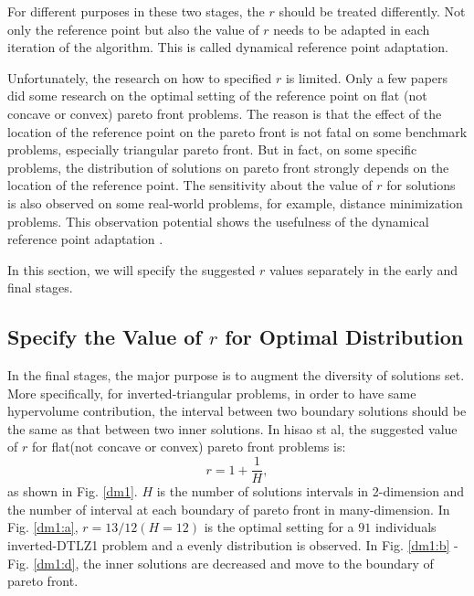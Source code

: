 \documentclass[conference]{IEEEtran}
\begin{document}
For different purposes in these two stages, the $r$ should be treated differently\cite{hisao:dynamic}. 
Not only the reference point but also the value of $r$ 
needs to be adapted in each iteration of the algorithm. 
This is called dynamical reference point adaptation. 

Unfortunately, the research on how to specified $r$ is limited.
Only a few papers\cite{hisao:RPexplanation, hisao:RPhowtoSpecify, hisao:RPspecify} 
did some research on the optimal setting of the reference point on 
flat (not concave or convex) pareto front problems. 
The reason is that the effect of the location of the reference point on the pareto front 
is not fatal on some benchmark problems, especially triangular pareto front. 
But in fact, on some specific problems, the distribution of solutions on pareto front
strongly depends on the location of the reference point. 
The sensitivity about the value of $r$ for solutions is also observed on some real-world problems,
for example, distance minimization problems.
This observation potential shows the usefulness of the dynamical reference point adaptation
\cite{hisao:dynamic}.

In this section, we will specify the suggested $r$ values separately
in the early and final stages.

%
\subsection{Specify the Value of $r$ for Optimal Distribution}
In the final stages, the major purpose is to augment the diversity of solutions set.
More specifically, for inverted-triangular problems, in order to have same hypervolume contribution, 
the interval between two boundary solutions should be the same as that between two inner solutions.
In hisao st al\cite{hisao:RPhowtoSpecify}, the suggested value of $r$ for flat(not concave or convex) pareto front problems is:
\begin{equation}\label{eod}
  r=1+\frac{1}{H},
\end{equation}
as shown in Fig. \ref{dm1}. $H$ is the number of solutions intervals in 2-dimension 
and the number of interval at each boundary of pareto front in many-dimension.
In Fig. \ref{dm1:a}, $r=13/12(H=12)$ is the optimal setting for a $91$ individuals 
inverted-DTLZ1 problem and a evenly distribution is observed. 
In Fig. \ref{dm1:b} - Fig. \ref{dm1:d}, the inner solutions are decreased and move to
the boundary of pareto front. 
\end{document}
